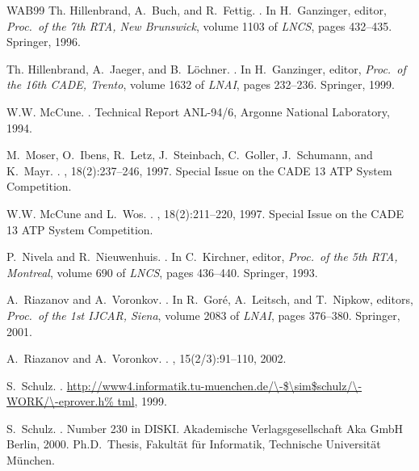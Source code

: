 \documentclass{article}
\begin{document}
\begin{thebibliography}{WAB{\etalchar{+}}99}
Th. Hillenbrand, A.~Buch, and R.~Fettig.
.
\newblock In H.~Ganzinger, editor, {\em Proc.\ of the 7th RTA, New Brunswick},
  volume 1103 of {\em LNCS}, pages 432--435. Springer, 1996.

Th. Hillenbrand, A.~Jaeger, and B.~L{\"o}chner.
.
\newblock In H.~Ganzinger, editor, {\em Proc.\ of the 16th CADE, Trento},
  volume 1632 of {\em LNAI}, pages 232--236. Springer, 1999.

W.W. McCune.
.
\newblock Technical Report ANL-94/6, Argonne National Laboratory, 1994.

M.~Moser, O.~Ibens, R.~Letz, J.~Steinbach, C.~Goller, J.~Schumann, and K.~Mayr.
.
, 18(2):237--246, 1997.
\newblock Special Issue on the CADE 13 ATP System Competition.

W.W. McCune and L.~Wos.
.
, 18(2):211--220, 1997.
\newblock Special Issue on the CADE 13 ATP System Competition.

P.~Nivela and R.~Nieuwenhuis.
.
\newblock In C.~Kirchner, editor, {\em Proc.\ of the 5th RTA, Montreal}, volume
  690 of {\em LNCS}, pages 436--440. Springer, 1993.

A.~Riazanov and A.~Voronkov.
.
\newblock In R.~Gor{\'e}, A.~Leitsch, and T.~Nipkow, editors, {\em Proc.\ of
  the 1st IJCAR, Siena}, volume 2083 of {\em LNAI}, pages 376--380. Springer,
  2001.

A.~Riazanov and A.~Voronkov.
.
, 15(2/3):91--110, 2002.

S.~Schulz.
.
\newblock
  \url{http://www4.informatik.tu-muenchen.de/\-$\sim$schulz/\-WORK/\-eprover.h%
tml}, 1999.

S.~Schulz.
.
\newblock Number 230 in DISKI. Akademische Verlagsgesellschaft Aka GmbH Berlin,
  2000.
\newblock Ph.D.~Thesis, Fakult{\"a}t f{\"u}r Informatik, Technische
  Universit{\"a}t M{\"u}nchen.


\end{thebibliography}
\end{document}
